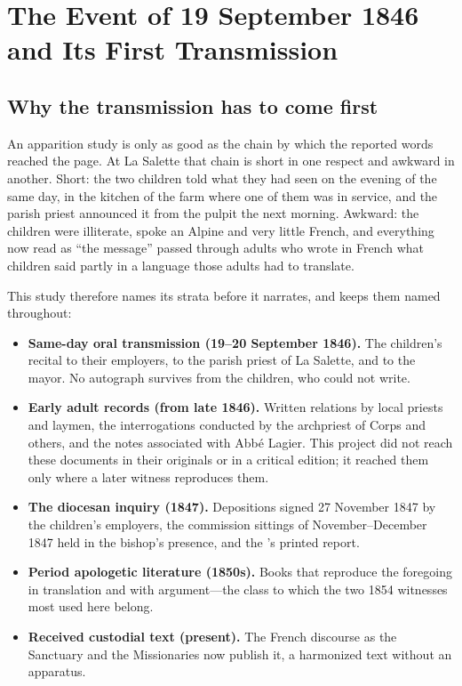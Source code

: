 \section{The Event of 19 September 1846 and Its First Transmission}

\subsection{Why the transmission has to come first}

An apparition study is only as good as the chain by which the
reported words reached the page. At La Salette that chain is short
in one respect and awkward in another. Short: the two children told
what they had seen on the evening of the same day, in the kitchen of
the farm where one of them was in service, and the parish priest
announced it from the pulpit the next morning. Awkward: the children
were illiterate, spoke an Alpine  and very little
French, and everything now read as ``the message'' passed through
adults who wrote in French what children said partly in a language
those adults had to translate.

This study therefore names its strata before it narrates, and keeps
them named throughout:

\begin{itemize}[leftmargin=1.2em,itemsep=0.15em,topsep=0.25em]
\item \textbf{Same-day oral transmission (19--20 September 1846).}
The children's recital to their employers, to the parish priest of
La Salette, and to the mayor. No autograph survives from the
children, who could not write.
\item \textbf{Early adult records (from late 1846).} Written
relations by local priests and laymen, the interrogations conducted
by the archpriest of Corps and others, and the notes associated with
Abbé Lagier. This project did not reach these documents in their
originals or in a critical edition; it reached them only where a
later witness reproduces them.
\item \textbf{The diocesan inquiry (1847).} Depositions signed 27
November 1847 by the children's employers, the commission sittings
of November--December 1847 held in the bishop's presence, and the
's printed report.
\item \textbf{Period apologetic literature (1850s).} Books that
reproduce the foregoing in translation and with argument---the class
to which the two 1854 witnesses most used here belong.
\item \textbf{Received custodial text (present).} The French
discourse as the Sanctuary and the Missionaries now publish it, a
harmonized text without an apparatus.
\end{itemize}

